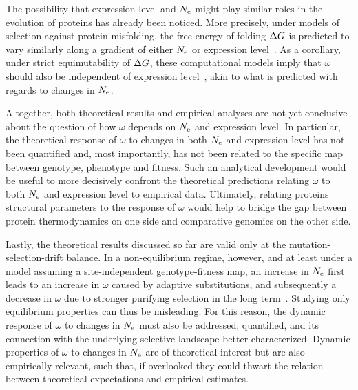 \documentclass[authoryear]{elsarticle} %
\begin{document}
The possibility that expression level and $N_{\text{e}}$ might play similar roles in the evolution of proteins has already been noticed.
More precisely, under models of selection against protein misfolding, the free energy of folding $\Delta G$ is predicted to vary similarly along a gradient of either $N_{\text{e}}$ or expression level~\citep{Serohijos2013}.
As a corollary, under strict equimutability of $\Delta G$, these computational models imply that $\omega$ should also be independent of expression level~\citep{Serohijos2012}, akin to what is predicted with regards to changes in $N_{\text{e}}$.

Altogether, both theoretical results and empirical analyses are not yet conclusive about the question of how $\omega$ depends on $N_{\text{e}}$ and expression level.
In particular, the theoretical response of $\omega$ to changes in both $N_{\text{e}}$ and expression level has not been quantified and, most importantly, has not been related to the specific map between genotype, {phenotype} and fitness.
Such an analytical development would be useful to more decisively confront the theoretical predictions relating $\omega$ to both $N_{\text{e}}$ and expression level to empirical data.
Ultimately, relating proteins structural parameters to the response of $\omega$ would help to bridge the gap between protein thermodynamics on one side and comparative genomics on the other side.

Lastly, the theoretical results discussed so far are valid only at the mutation-selection-drift balance.
In a non-equilibrium regime, however, and at least under a model assuming a site-independent genotype-fitness map, an increase in $N_{\text{e}}$ first leads to an increase in $\omega$ caused by adaptive {substitutions}, and subsequently a decrease in $\omega$ due to stronger purifying selection in the long term~\citep{Jones2016}.
Studying only equilibrium properties can thus be misleading.
For this reason, the dynamic response of $\omega$ to changes in $N_{\text{e}}$ must also be addressed, quantified, and its connection with the underlying selective landscape better characterized.
Dynamic properties of $\omega$ to changes in $N_{\text{e}}$ are of theoretical interest but are also empirically relevant, such that, if overlooked they could thwart the relation between theoretical expectations and empirical estimates.
\end{document}
